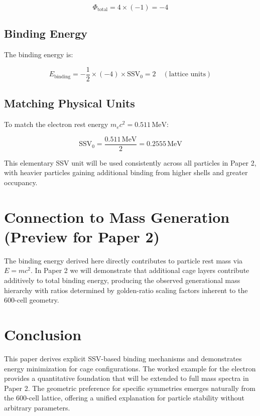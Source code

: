 \documentclass[11pt]{article}
\begin{document}
\begin{equation}
\Phi_{\text{total}} = 4 \times (-1) = -4
\end{equation}

\subsection{Binding Energy}
The binding energy is:

\begin{equation}
E_{\text{binding}} = -\frac{1}{2} \times (-4) \times \text{SSV}_0 = 2 \quad (\text{lattice units})
\end{equation}

\subsection{Matching Physical Units}
To match the electron rest energy $m_e c^2 = 0.511 \, \text{MeV}$:

\begin{equation}
\text{SSV}_0 = \frac{0.511 \, \text{MeV}}{2} = 0.2555 \, \text{MeV}
\end{equation}

This elementary SSV unit will be used consistently across all particles in Paper 2, with heavier particles gaining additional binding from higher shells and greater occupancy.

\section{Connection to Mass Generation (Preview for Paper 2)}

The binding energy derived here directly contributes to particle rest mass via $E = mc^2$. In Paper 2 we will demonstrate that additional cage layers contribute additively to total binding energy, producing the observed generational mass hierarchy with ratios determined by golden-ratio scaling factors inherent to the 600-cell geometry.

\section{Conclusion}

This paper derives explicit SSV-based binding mechanisms and demonstrates energy minimization for cage configurations. The worked example for the electron provides a quantitative foundation that will be extended to full mass spectra in Paper 2. The geometric preference for specific symmetries emerges naturally from the 600-cell lattice, offering a unified explanation for particle stability without arbitrary parameters.
\end{document}
